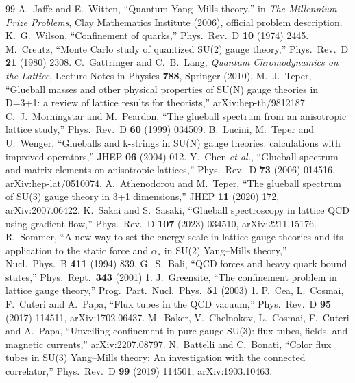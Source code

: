 \documentclass[11pt,a4paper]{article}
\theoremstyle{definition}
\theoremstyle{remark}
\begin{document}
\begin{thebibliography}{99}\small
{} A.~Jaffe and E.~Witten, ``Quantum Yang--Mills theory,'' in \emph{The Millennium Prize Problems}, Clay Mathematics Institute (2006), official problem description.
 K.~G.~Wilson, ``Confinement of quarks,'' Phys.\ Rev.\ D \textbf{10} (1974) 2445.
 M.~Creutz, ``Monte Carlo study of quantized SU(2) gauge theory,'' Phys.\ Rev.\ D \textbf{21} (1980) 2308.
 C.~Gattringer and C.~B.~Lang, \emph{Quantum Chromodynamics on the Lattice}, Lecture Notes in Physics \textbf{788}, Springer (2010).
 M.~J.~Teper, ``Glueball masses and other physical properties of SU(N) gauge theories in D=3+1: a review of lattice results for theorists,'' arXiv:hep-th/9812187.
 C.~J.~Morningstar and M.~Peardon, ``The glueball spectrum from an anisotropic lattice study,'' Phys.\ Rev.\ D \textbf{60} (1999) 034509.
 B.~Lucini, M.~Teper and U.~Wenger, ``Glueballs and k-strings in SU(N) gauge theories: calculations with improved operators,'' JHEP \textbf{06} (2004) 012.
 Y.~Chen \emph{et al.}, ``Glueball spectrum and matrix elements on anisotropic lattices,'' Phys.\ Rev.\ D \textbf{73} (2006) 014516, arXiv:hep-lat/0510074.
 A.~Athenodorou and M.~Teper, ``The glueball spectrum of SU(3) gauge theory in 3+1 dimensions,'' JHEP \textbf{11} (2020) 172, arXiv:2007.06422.
 K.~Sakai and S.~Sasaki, ``Glueball spectroscopy in lattice QCD using gradient flow,'' Phys.\ Rev.\ D \textbf{107} (2023) 034510, arXiv:2211.15176.
 R.~Sommer, ``A new way to set the energy scale in lattice gauge theories and its application to the static force and $\alpha_s$ in SU(2) Yang--Mills theory,'' Nucl.\ Phys.\ B \textbf{411} (1994) 839.
 G.~S.~Bali, ``QCD forces and heavy quark bound states,'' Phys.\ Rept.\ \textbf{343} (2001) 1.
 J.~Greensite, ``The confinement problem in lattice gauge theory,'' Prog.\ Part.\ Nucl.\ Phys.\ \textbf{51} (2003) 1.
 P.~Cea, L.~Cosmai, F.~Cuteri and A.~Papa, ``Flux tubes in the QCD vacuum,'' Phys.\ Rev.\ D \textbf{95} (2017) 114511, arXiv:1702.06437.
 M.~Baker, V.~Chelnokov, L.~Cosmai, F.~Cuteri and A.~Papa, ``Unveiling confinement in pure gauge SU(3): flux tubes, fields, and magnetic currents,'' arXiv:2207.08797.
 N.~Battelli and C.~Bonati, ``Color flux tubes in SU(3) Yang--Mills theory: An investigation with the connected correlator,'' Phys.\ Rev.\ D \textbf{99} (2019) 114501, arXiv:1903.10463.

\end{thebibliography}
\end{document}
